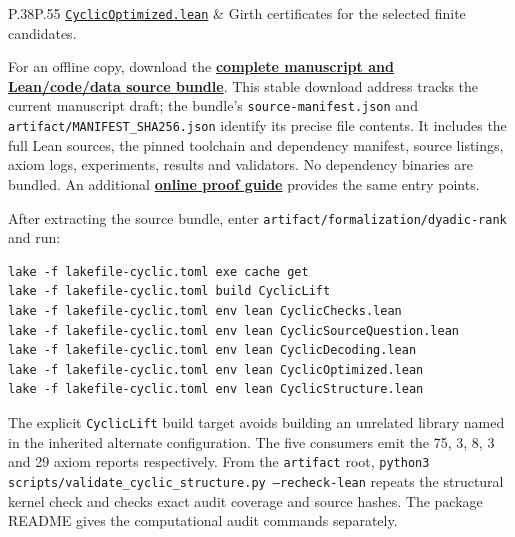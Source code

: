 \documentclass[11pt]{article}
\theoremstyle{definition}
\theoremstyle{remark}
\begin{document}
\begin{table}[htbp]
\begin{tabular}{P{.38\linewidth}P{.55\linewidth}}
\href{https://github.com/alectionary/vibe-math/blob/5dbda826fb9d385cf5528694f6908d28bc94054d/formalization/dyadic-rank/CyclicOptimized.lean}{\texttt{CyclicOptimized.lean}} & Girth certificates for the selected finite candidates. \\
\bottomrule
\end{tabular}
\caption{Clickable roadmap to the complete formalization. Other library
modules and the checking consumer are present in the linked directory.}
\label{tab:source-guide}
\end{table}

For an offline copy, download the
\href{https://github.com/alectionary/vibe-math/raw/refs/heads/master/formalization/cyclic-lifts/paper/cyclic-lift-girth-eight-source.zip}{\textbf{complete manuscript and Lean/code/data source bundle}}.
This stable download address tracks the current manuscript draft; the
bundle's \texttt{source-manifest.json} and
\texttt{artifact/MANIFEST\_SHA256.json} identify its precise file contents.
It includes the full Lean sources, the pinned toolchain and dependency
manifest, source listings, axiom logs, experiments, results and validators.
No dependency binaries are bundled. An additional
\href{https://github.com/alectionary/vibe-math/blob/master/formalization/cyclic-lifts/paper/LEAN-PROOF-GUIDE.md}{\textbf{online proof guide}}
provides the same entry points.

After extracting the source bundle, enter
\texttt{artifact/formalization/dyadic-rank} and run:
\par\medskip\noindent\begin{minipage}{\linewidth}
\begin{lstlisting}[basicstyle=\small\ttfamily]
lake -f lakefile-cyclic.toml exe cache get
lake -f lakefile-cyclic.toml build CyclicLift
lake -f lakefile-cyclic.toml env lean CyclicChecks.lean
lake -f lakefile-cyclic.toml env lean CyclicSourceQuestion.lean
lake -f lakefile-cyclic.toml env lean CyclicDecoding.lean
lake -f lakefile-cyclic.toml env lean CyclicOptimized.lean
lake -f lakefile-cyclic.toml env lean CyclicStructure.lean
\end{lstlisting}
\end{minipage}\par\medskip
The explicit \texttt{CyclicLift} build target avoids building an unrelated
library named in the inherited alternate configuration. The five consumers
emit the 75, 3, 8, 3 and 29 axiom reports respectively. From the
\texttt{artifact} root, \texttt{python3 scripts/validate\_cyclic\_structure.py
--recheck-lean} repeats the structural kernel check and checks exact audit
coverage and source hashes. The package README gives the computational
audit commands separately.
\end{document}
